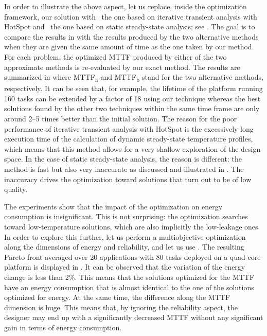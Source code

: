 In order to illustrate the above aspect, let us replace, inside the optimization
framework, our solution with \one~the one based on iterative transient analysis
with HotSpot and \two~the one based on static steady-state analysis; see
. The goal is to compare the results in
 with the results produced by the two alternative
methods when they are given the same amount of time as the one taken by our
method. For each problem, the optimized \ac{MTTF} produced by either of the two
approximate methods is re-evaluated by our exact method. The results are
summarized in  where
\ac{MTTF}\textsubscript{a} and \ac{MTTF}\textsubscript{b} stand for the two
alternative methods, respectively. It can be seen that, for example, the
lifetime of the platform running 160 tasks can be extended by a factor of 18
using our technique whereas the best solutions found by the other two techniques
within the same time frame are only around 2--5 times better than the initial
solution. The reason for the poor performance of iterative transient analysis
with HotSpot is the excessively long execution time of the calculation of
dynamic steady-state temperature profiles, which means that this method allows
for a very shallow exploration of the design space. In the case of static
steady-state analysis, the reason is different: the method is fast but also very
inaccurate as discussed and illustrated in . The
inaccuracy drives the optimization toward solutions that turn out to be of low
quality.

The experiments show that the impact of the optimization on energy consumption
is insignificant. This is not surprising: the optimization searches toward
low-temperature solutions, which are also implicitly the low-leakage ones. In
order to explore this further, let us perform a multiobjective optimization
along the dimensions of energy and reliability, and let us use 
\cite{deb2002}. The resulting Pareto front averaged over 20 applications with 80
tasks deployed on a quad-core platform is displayed in
. It can be observed that the variation
of the energy change is less than 2\%. This means that the solutions optimized
for the \ac{MTTF} have an energy consumption that is almost identical to the one
of the solutions optimized for energy. At the same time, the difference along
the \ac{MTTF} dimension is huge. This means that, by ignoring the reliability
aspect, the designer may end up with a significantly decreased \ac{MTTF} without
any significant gain in terms of energy consumption.

